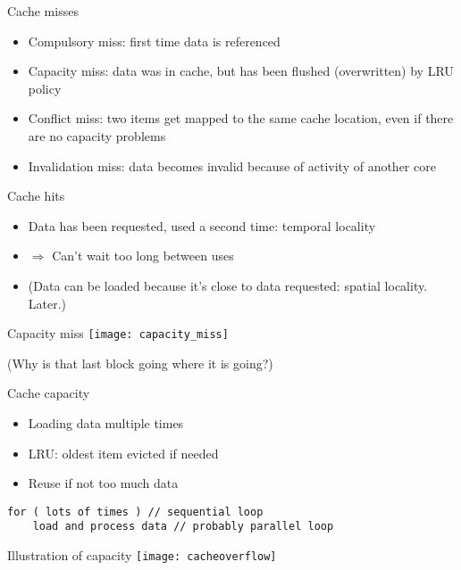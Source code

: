 \begin{numberedframe}{Cache misses}
  \begin{itemize}
  \item Compulsory miss: first time data is referenced
  \item Capacity miss: data was in cache, but has been flushed (overwritten)
    by LRU policy
  \item Conflict miss: two items get mapped to the same cache location,
    even if there are no capacity problems
  \item Invalidation miss: data becomes invalid because of activity of another core
  \end{itemize}  
\end{numberedframe}

\begin{numberedframe}{Cache hits}
  \begin{itemize}
  \item Data has been requested,
    used a second time: temporal locality
  \item $\Rightarrow$ Can't wait too long between uses
  \item (Data can be loaded because it's close
    to data requested: spatial locality. Later.)
  \end{itemize}
\end{numberedframe}

\begin{numberedframe}{Capacity miss}
  \texttt{[image: capacity\_miss]}

  (Why is that last block going where it is going?)
\end{numberedframe}

\begin{numberedframe}{Cache capacity}
  \begin{itemize}
  \item Loading data multiple times
  \item LRU: oldest item evicted if needed
  \item Reuse if not too much data
  \end{itemize}
\begin{lstlisting}
for ( lots of times ) // sequential loop
    load and process data // probably parallel loop
\end{lstlisting}
\end{numberedframe}

\begin{numberedframe}{Illustration of capacity}
  \texttt{[image: cacheoverflow]}
\end{numberedframe}

